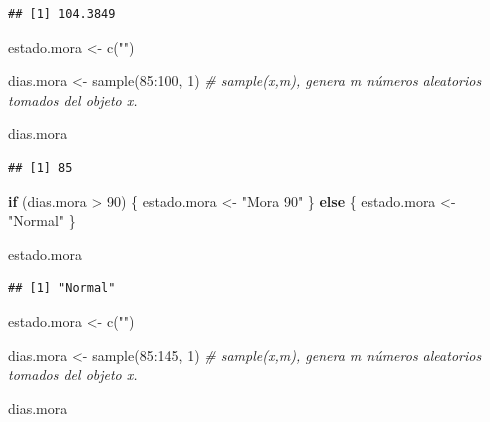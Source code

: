 \documentclass[
  12pt,
]{book}
\newenvironment{Shaded}{\begin{snugshade}}{\end{snugshade}}
\newcommand{\CommentTok}[1]{\textcolor[rgb]{0.56,0.35,0.01}{\textit{#1}}}
\newcommand{\ControlFlowTok}[1]{\textcolor[rgb]{0.13,0.29,0.53}{\textbf{#1}}}
\newcommand{\DecValTok}[1]{\textcolor[rgb]{0.00,0.00,0.81}{#1}}
\newcommand{\FunctionTok}[1]{\textcolor[rgb]{0.00,0.00,0.00}{#1}}
\newcommand{\NormalTok}[1]{#1}
\newcommand{\OtherTok}[1]{\textcolor[rgb]{0.56,0.35,0.01}{#1}}
\newcommand{\SpecialCharTok}[1]{\textcolor[rgb]{0.00,0.00,0.00}{#1}}
\newcommand{\StringTok}[1]{\textcolor[rgb]{0.31,0.60,0.02}{#1}}
\begin{document}
\begin{verbatim}
## [1] 104.3849
\end{verbatim}

\begin{Shaded}
\begin{Highlighting}[]
\NormalTok{estado.mora }\OtherTok{\textless{}{-}} \FunctionTok{c}\NormalTok{(}\StringTok{""}\NormalTok{)}

\NormalTok{dias.mora }\OtherTok{\textless{}{-}} \FunctionTok{sample}\NormalTok{(}\DecValTok{85}\SpecialCharTok{:}\DecValTok{100}\NormalTok{, }\DecValTok{1}\NormalTok{) }\CommentTok{\# sample(x,m), genera m números aleatorios tomados del objeto x.}

\NormalTok{dias.mora}
\end{Highlighting}
\end{Shaded}

\begin{verbatim}
## [1] 85
\end{verbatim}

\begin{Shaded}
\begin{Highlighting}[]
\ControlFlowTok{if}\NormalTok{ (dias.mora }\SpecialCharTok{\textgreater{}} \DecValTok{90}\NormalTok{) \{}
\NormalTok{  estado.mora }\OtherTok{\textless{}{-}} \StringTok{"Mora 90"}
\NormalTok{\} }\ControlFlowTok{else}\NormalTok{ \{}
\NormalTok{  estado.mora }\OtherTok{\textless{}{-}} \StringTok{"Normal"}
\NormalTok{\}}

\NormalTok{estado.mora}
\end{Highlighting}
\end{Shaded}

\begin{verbatim}
## [1] "Normal"
\end{verbatim}

\begin{Shaded}
\begin{Highlighting}[]
\NormalTok{estado.mora }\OtherTok{\textless{}{-}} \FunctionTok{c}\NormalTok{(}\StringTok{""}\NormalTok{)}

\NormalTok{dias.mora }\OtherTok{\textless{}{-}} \FunctionTok{sample}\NormalTok{(}\DecValTok{85}\SpecialCharTok{:}\DecValTok{145}\NormalTok{, }\DecValTok{1}\NormalTok{) }\CommentTok{\# sample(x,m), genera m números aleatorios tomados del objeto x.}

\NormalTok{dias.mora}
\end{Highlighting}
\end{Shaded}
\end{document}

